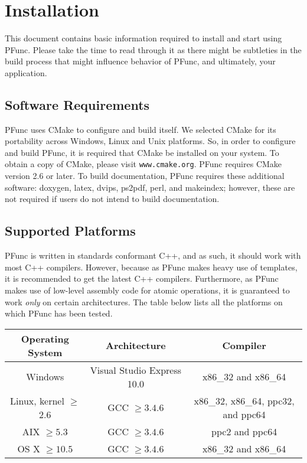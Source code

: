 \section{Installation}
\label{sec:install}
%
This document contains basic information required to install and start using
PFunc. 
%
Please take the time to read through it as there might be subtleties in the
build process that might influence behavior of PFunc, and ultimately, your
application. 
%

\subsection{Software Requirements}
\label{subsec:install_requirements}
PFunc uses CMake to configure and build itself. We selected CMake for its
portability across Windows, Linux and Unix platforms. 
%
So, in order to configure and build PFunc, it is required that CMake be
installed on your system.
%
To obtain a copy of CMake, please visit \texttt{www.cmake.org}. PFunc requires
CMake version 2.6 or later.
%
To build documentation, PFunc requires these additional software: doxygen,
latex, dvips, ps2pdf, perl, and makeindex; however, these are not required 
if users do not intend to build documentation.

\subsection{Supported Platforms}
\label{subsec:supported_platforms}
%
PFunc is written in standards conformant C++, and as such, it should work with
most C++ compilers. 
%
However, because as PFunc makes heavy use of templates, it is recommended to
get the latest C++ compilers. 
%
Furthermore, as PFunc makes use of low-level assembly code for atomic
operations, it is guaranteed to work \textit{only} on certain architectures.
%
The table below lists all the platforms on which PFunc has been tested.

\begin{center}
\begin{tabular}{|c|c|c|}
\hline
Operating System & Architecture & Compiler \\
\hline
Windows & Visual Studio Express 10.0 & x86\_32 and x86\_64 \\
\hline
Linux, kernel $\ge{}$2.6 & GCC $\ge{}3.4.6$ & x86\_32, x86\_64, ppc32, and ppc64 \\
\hline
AIX $\ge{}5.3$ & GCC $\ge{}3.4.6$ & ppc2 and ppc64 \\
\hline
OS X $\ge{}10.5$ & GCC $\ge{}3.4.6$ & x86\_32 and x86\_64 \\
\hline
\end{tabular}
\end{center}

